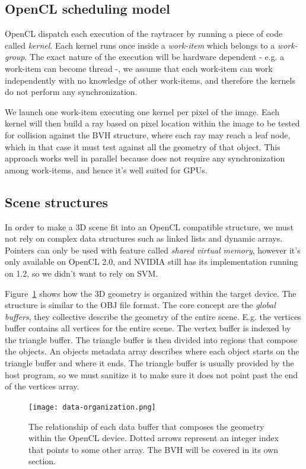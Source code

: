 \documentclass{vgtc}
\begin{document}
\subsection{OpenCL scheduling model}

OpenCL dispatch each execution of the raytracer by running a piece of
code called \emph{kernel}. Each kernel runs once inside a
\emph{work-item} which belongs to a \emph{work-group}. The exact
nature of the execution will be hardware dependent - e.g. a work-item
can become thread -, we assume that each work-item can work
independently with no knowledge of other work-items, and therefore the
kernels do not perform any synchronization.

We launch one work-item executing one kernel per pixel of the
image. Each kernel will then build a ray based on pixel location
within the image to be tested for collision against the BVH structure,
where each ray may reach a leaf node, which in that case it must test
against all the geometry of that object. This approach works well in
parallel because does not require any synchronization among
work-items, and hence it's well suited for GPUs.


\subsection{Scene structures}

In order to make a 3D scene fit into an OpenCL compatible structure,
we must not rely on complex data structures such as linked lists and
dynamic arrays. Pointers can only be used with feature called
\emph{shared virtual memory}, however it's only available on OpenCL
2.0, and NVIDIA still has its implementation running on 1.2, so we
didn't want to rely on SVM.

Figure~\ref{fig:data-org} shows how the 3D geometry is organized
within the target device. The structure is similar to the OBJ file
format. The core concept are the \emph{global buffers}, they
collective describe the geometry of the entire scene. E.g. the
vertices buffer contains all vertices for the entire scene. The vertex
buffer is indexed by the triangle buffer. The triangle buffer is then
divided into regions that compose the objects. An objects metadata
array describes where each object starts on the triangle buffer and
where it ends. The triangle buffer is usually provided by the host
program, so we must sanitize it to make sure it does not point past
the end of the vertices array.

\begin{figure}
\centering
\texttt{[image: data-organization.png]}
\caption{The relationship of each data buffer that composes the
  geometry within the OpenCL device. Dotted arrows represent an
  integer index that points to some other array. The BVH will be
  covered in its own section.}
\label{fig:data-org}
\end{figure}
\end{document}
